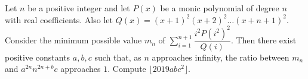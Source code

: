 Let $n$ be a positive integer and let $P(x)$ be a monic polynomial of degree $n$ with real coefficients. Also let $Q(x)=(x+1)^2(x+2)^2\dots (x+n+1)^2$. Consider the minimum possible value $m_n$ of $\displaystyle\sum_{i=1}^{n+1} \dfrac{i^2P(i^2)^2}{Q(i)}$. Then there exist positive constants $a,b,c$ such that, as $n$ approaches infinity, the ratio between $m_n$ and $a^{2n} n^{2n+b} c$ approaches $1$. Compute $\lfloor 2019 abc^2\rfloor$.
